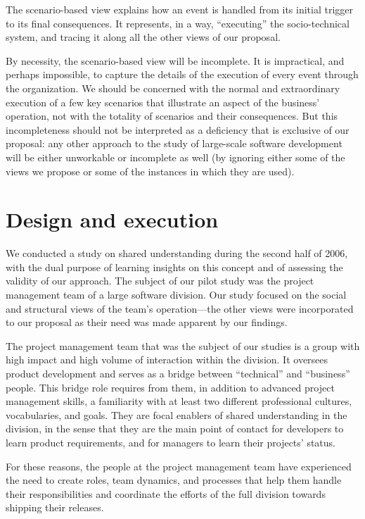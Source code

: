 The scenario-based view explains how an event is handled from its initial trigger to its final consequences. It represents, in a way, ``executing'' the socio-technical system, and tracing it along all the other views of our proposal.

By necessity, the scenario-based view will be incomplete. It is impractical, and perhaps impossible, to capture the details of the execution of every event through the organization. We should be concerned with the normal and extraordinary execution of a few key scenarios that illustrate an aspect of the business' operation, not with the totality of scenarios and their consequences. But this incompleteness should not be interpreted as a deficiency that is exclusive of our proposal: any other approach to the study of large-scale software development will be either unworkable or incomplete as well (by ignoring either some of the views we propose or some of the instances in which they are used).


\section{Design and execution}
\label{sec:IBMDesign}

We conducted a study on shared understanding during the second half of 2006, with the dual purpose of learning insights on this concept and of assessing the validity of our approach. The subject of our pilot study was the project management team of a large software division. Our study focused on the social and structural views of the team's operation---the other views were incorporated to our proposal as their need was made apparent by our findings.

The project management team that was the subject of our studies is a group with high impact and high volume of interaction within the division. It oversees product development and serves as a bridge between ``technical'' and ``business'' people. This bridge role requires from them, in addition to advanced project management skills, a familiarity with at least two different professional cultures, vocabularies, and goals. They are focal enablers of shared understanding in the division, in the sense that they are the main point of contact for developers to learn product requirements, and for managers to learn their projects' status.

For these reasons, the people at the project management team have experienced the need to create roles, team dynamics, and processes that help them handle their responsibilities and coordinate the efforts of the full division towards shipping their releases.

